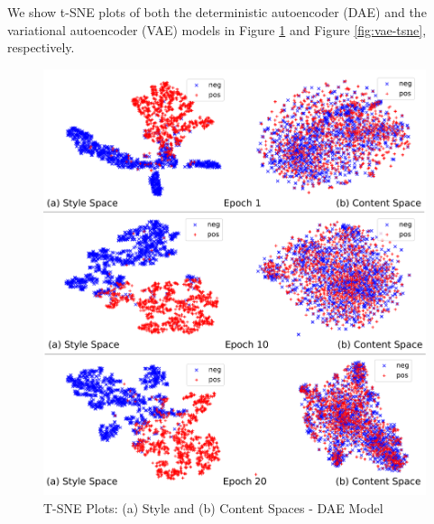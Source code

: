 We show t-SNE plots of both the deterministic autoencoder (DAE) and the variational autoencoder (VAE) models in Figure \ref{fig:dae-tsne} and Figure \ref{fig:vae-tsne}, respectively.

\begin{figure}[ht]
	\includegraphics[width=\linewidth]{images/latent-spaces-dae}
	\caption{T-SNE Plots: (a) Style and (b) Content Spaces - DAE Model}
	\label{fig:dae-tsne}
\end{figure}

